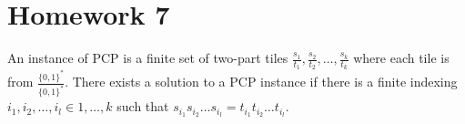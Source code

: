 









% 


\section{Homework 7}

An instance of PCP is a finite set of two-part tiles $\frac {s_1} {t_1}, \frac {s_2} {t_2}, \ldots, \frac {s_k} {t_k}$ where each tile is from $\frac {\{0, 1\}^{*}}{\{0, 1\}^{*}}$. There exists a solution to a PCP instance if there is a finite indexing $i_1, i_2, \ldots, i_l \in 1, \ldots, k$ such that $s_{i_1}s_{i_2}\ldots s_{i_l} = t_{i_1}t_{i_2}\ldots t_{i_l} $.


